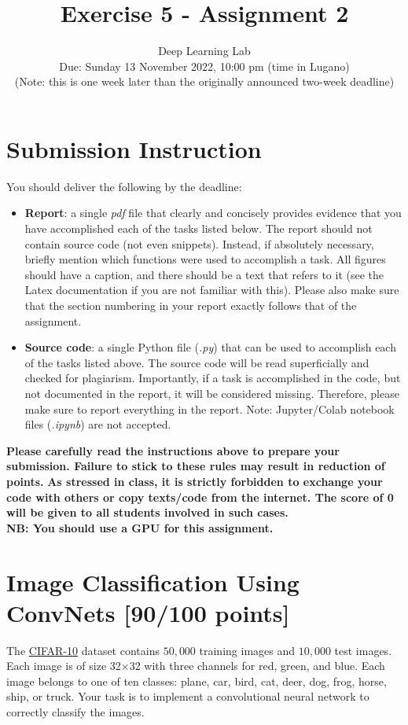 \documentclass[a4paper,11pt]{article}
\title{Exercise 5 - \textbf{Assignment 2}}
\author{Deep Learning Lab\\
Due: Sunday 13 November 2022, 10:00 pm (time in Lugano)
\\ (Note: this is one week later than the originally announced two-week deadline)
}
\begin{document}
\maketitle

\section*{Submission Instruction}
You should deliver the following by the deadline:
\begin{itemize}
 \item \textbf{Report}: a single \emph{pdf} file that clearly and concisely provides evidence that you have accomplished each of the tasks listed below. The report should not contain source code (not even snippets). Instead, if absolutely necessary, briefly mention which functions were used to accomplish a task. All figures should have a caption, and there should be a text that refers to it (see the Latex documentation if you are not familiar with this). Please also make sure that the section numbering in your report exactly follows that of the assignment.
 \item \textbf{Source code}: a single Python file (\emph{.py}) that can be used to accomplish each of the tasks listed above.  The source code will be read superficially and checked for plagiarism.
 Importantly, if a task is accomplished in the code, but not documented in the report, it will be considered missing. Therefore, please make sure to report everything in the report. Note: Jupyter/Colab notebook files (\emph{.ipynb}) are not accepted.
\end{itemize}
\textbf{Please carefully read the instructions above to prepare your submission.
Failure to stick to these rules may result in reduction of points.}
\textbf{As stressed in class, it is strictly forbidden to exchange your code with others or copy texts/code from the internet. The score of 0 will be given to all students involved in such cases.}\\

\textbf{NB: You should use a GPU for this assignment.}

\section{Image Classification Using ConvNets [90/100 points]}

The \href{https://www.cs.toronto.edu/~kriz/cifar.html}{CIFAR-10} dataset contains $50,000$ training images and $10,000$ test images.
Each image is of size 32$\times$32 with three channels for red, green, and blue. Each image belongs to one of ten classes:
plane, car, bird, cat, deer, dog, frog, horse, ship, or truck.
Your task is to implement a convolutional neural network to correctly classify the images.
\end{document}
